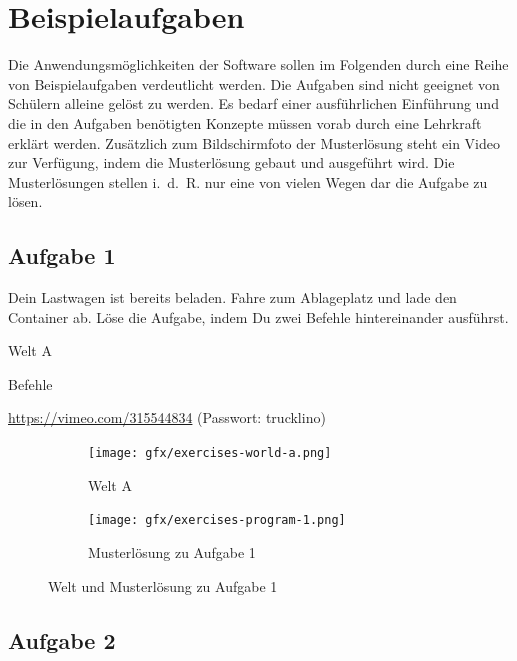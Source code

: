 \chapter{Beispielaufgaben}
\label{sec:exercises}

Die Anwendungsmöglichkeiten der Software sollen im Folgenden durch eine Reihe von Beispielaufgaben verdeutlicht werden. Die Aufgaben sind nicht geeignet von Schülern alleine gelöst zu werden. Es bedarf einer ausführlichen Einführung und die in den Aufgaben benötigten Konzepte müssen vorab durch eine Lehrkraft erklärt werden. Zusätzlich zum Bildschirmfoto der Musterlösung steht ein Video zur Verfügung, indem die Musterlösung gebaut und ausgeführt wird. Die Musterlösungen stellen i.~d.~R. nur eine von vielen Wegen dar die Aufgabe zu lösen.

\section*{Aufgabe 1}
\label{sec:exercises:1}

Dein Lastwagen ist bereits beladen. Fahre zum Ablageplatz und lade den Container ab. Löse die Aufgabe, indem Du zwei Befehle hintereinander ausführst.

\begin{description}[noitemsep]
  \item[Welt wählen:] Welt A
  \item[Du brauchst:] Befehle
  \item[Video:] \url{https://vimeo.com/315544834} (Passwort: trucklino)
\end{description}

\begin{figure}[H]
  \begin{subfigure}[b]{0.40\textwidth}
    \texttt{[image: gfx/exercises-world-a.png]}
    \caption{Welt A}
  \end{subfigure}\hfill
  \begin{subfigure}[b]{0.40\textwidth}
    \texttt{[image: gfx/exercises-program-1.png]}
    \caption{Musterlösung zu Aufgabe 1}
  \end{subfigure}\hfill
  \caption{Welt und Musterlösung zu Aufgabe 1}
\end{figure}

\pagebreak

\section*{Aufgabe 2}
\label{sec:exercises:2}

